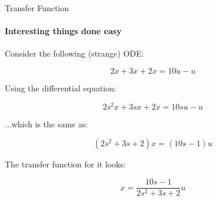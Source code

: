 \documentclass{beamer}
\begin{document}
\begin{frame}{Transfer Function}
\framesubtitle{Interesting things done easy}
\begin{flushleft}

Consider the following (strange) ODE:

\begin{equation}
2 \ddot x + 3 \dot x + 2 x = 10 \dot u - u
\end{equation}

Using the differential equation:

\begin{equation}
2 s^2 x + 3s x + 2x = 10s u - u
\end{equation}

...which is the same as:

\begin{equation}
(2s^2 + 3s + 2)x = (10s - 1)u
\end{equation}

The transfer function for it looks: 

\begin{equation}
x = \frac{10s - 1}{2s^2 + 3s + 2} u
\end{equation}

\end{flushleft}
\end{frame}
\end{document}
